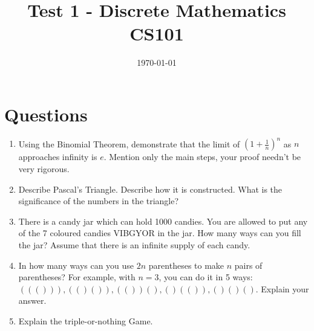 \documentclass{article}
\title{Test 1 - Discrete Mathematics CS101}
\date{\today}
\begin{document}
\maketitle

\section*{Questions}

\begin{enumerate}
		\item Using the Binomial Theorem, demonstrate that the limit of \((1 + \frac{1}{n})^n\) as \(n\) approaches infinity is \(e\). Mention only the main steps, your proof needn't be very rigorous. 

		\item Describe Pascal's Triangle. Describe how it is constructed. What is the significance of the numbers in the triangle?

		\item There is a candy jar which can hold 1000 candies. You are allowed to put any of the 7 coloured candies VIBGYOR in the jar. How many ways can you fill the jar? Assume that there is an infinite supply of each candy. 

		\item In how many ways can you use $2n$ parentheses to make $n$ pairs of parentheses? For example, with $n = 3$, you can do it in 5 ways: $((())), (()()), (())(), ()(()), ()()()$. Explain your answer. 

		\item Explain the triple-or-nothing Game. 
    
\end{enumerate}
\end{document}
